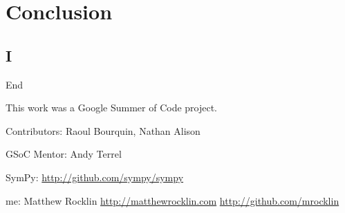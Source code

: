 \documentclass[compress, blue]{beamer}
\begin{document}
\section{Conclusion}
\subsection{I}
\begin{frame}{End}

    \begin{centering}
        This work was a Google Summer of Code project. 

        Contributors: Raoul Bourquin, Nathan Alison

        GSoC Mentor: Andy Terrel

        SymPy: \url{http://github.com/sympy/sympy}


        me: Matthew Rocklin
        \url{http://matthewrocklin.com}
        \url{http://github.com/mrocklin}

    \end{centering}
\end{frame}
\end{document}
